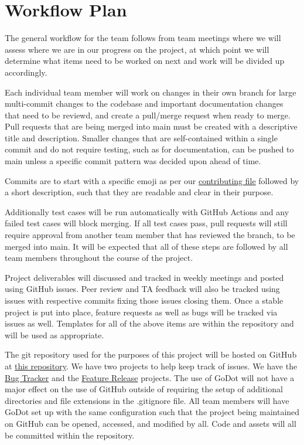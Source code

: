\documentclass{article}
\begin{document}
\newpage
\section{Workflow Plan}

The general workflow for the team follows from team meetings where we will assess where we are in our progress on the project, at which point we will determine what items need to be worked on next and work will be divided up accordingly.

Each individual team member will work on changes in their own branch for large multi-commit changes to the codebase and important documentation changes that need to be reviewd, and create a pull/merge request when ready to merge. Pull requests that are being merged into main must be created with a descriptive title and description. Smaller changes that are self-contained within a single commit and do not require testing, such as for documentation, can be pushed to main unless a specific commit pattern was decided upon ahead of time.

Commits are to start with a specific emoji as per our \href{https://github.com/John-Popovici/duel-of-the-eights/blob/main/CONTRIBUTING.md}{contributing file} followed by a short description, such that they are readable and clear in their purpose.

Additionally test cases will be run automatically with GitHub Actions and any failed test cases will block merging. If all test cases pass, pull requests will still require approval from another team member that has reviewed the branch, to be merged into main. It will be expected that all of these steps are followed by all team members throughout the course of the project.

Project deliverables will discussed and tracked in weekly meetings and posted using GitHub issues. Peer review and TA feedback will also be tracked using issues with respective commits fixing those issues closing them. Once a stable project is put into place, feature requests as well as bugs will be tracked via issues as well. Templates for all of the above items are within the repository and will be used as appropriate.

The git repository used for the purposes of this project will be hosted on GitHub at  \href{https://github.com/John-Popovici/duel-of-the-eights.git}{this repository}.
We have two projects to help keep track of issues. We have the
\href{https://github.com/users/John-Popovici/projects/1/views/1}{Bug Tracker}
and the
\href{https://github.com/users/John-Popovici/projects/2/views/1}{Feature Release} projects.
The use of GoDot will not have a major effect on the use of GitHub outside of requiring the setup of additional directories and file extensions in the .gitignore file. All team members will have GoDot set up with the same configuration such that the project being maintained on GitHub can be opened, accessed, and modified by all. Code and assets will all be committed within the repository.\newline
\end{document}
